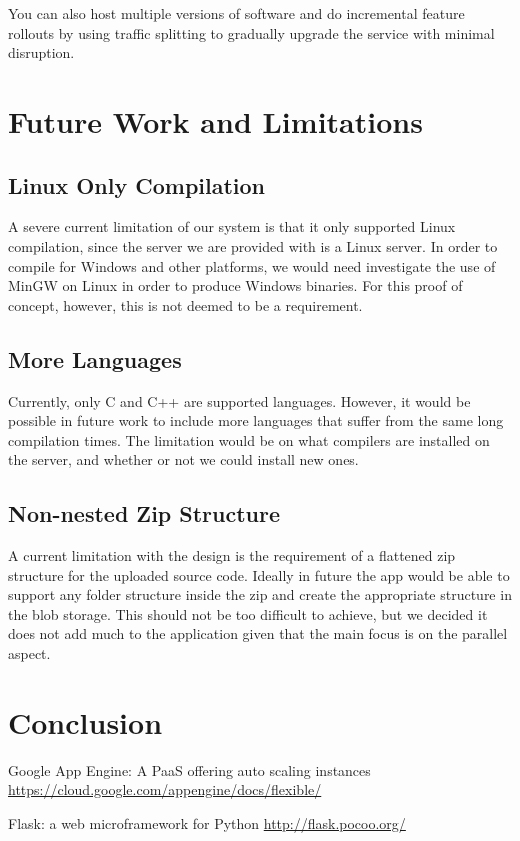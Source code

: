 \documentclass[conference]{IEEEtran}
\begin{document}
You can also host multiple versions of software and do incremental feature rollouts by using traffic splitting to gradually upgrade the service with minimal disruption.


\section{Future Work and Limitations}
\subsection{Linux Only Compilation}
A severe current limitation of our system is that it only supported Linux
compilation, since the server we are provided with is a Linux server. In order
to compile for Windows and other platforms, we would need investigate the use of
MinGW on Linux in order to produce Windows binaries. For this proof of concept,
however, this is not deemed to be a requirement.
\subsection{More Languages}
Currently, only C and C++ are supported languages. However, it would be possible
in future work to include more languages that suffer from the same long
compilation times. The limitation would be on what compilers are installed on
the server, and whether or not we could install new ones.
\subsection{Non-nested Zip Structure}
A current limitation with the design is the requirement of a flattened zip
structure for the uploaded source code. Ideally in future the app would be able
to support any folder structure inside the zip and create the appropriate
structure in the blob storage. This should not be too difficult to achieve, but
we decided it does not add much to the application given that the main focus is
on the parallel aspect.
\section{Conclusion}

\begin{thebibliography}{00}
    Google App Engine: A PaaS offering auto scaling instances
    \url{https://cloud.google.com/appengine/docs/flexible/}

    Flask: a web microframework for Python
    \url{http://flask.pocoo.org/}
\end{thebibliography}
\end{document}
